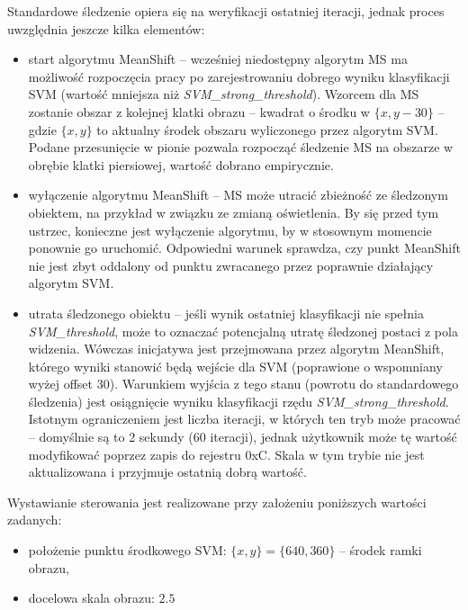 Standardowe śledzenie opiera się na weryfikacji ostatniej iteracji, jednak proces uwzględnia jeszcze kilka elementów:
\begin{itemize}
	\item start algorytmu MeanShift -- wcześniej niedostępny algorytm MS ma możliwość rozpoczęcia pracy po zarejestrowaniu dobrego wyniku klasyfikacji SVM (wartość mniejsza niż \textit{SVM\_strong\_threshold}). %
	Wzorcem dla MS zostanie obszar z kolejnej klatki obrazu -- kwadrat o środku w $\{x,y-30\}$ -- gdzie $\{x,y\}$ to aktualny środek obszaru wyliczonego przez algorytm SVM. 
	Podane przesunięcie w pionie pozwala rozpocząć śledzenie MS na obszarze w obrębie klatki piersiowej, wartość dobrano empirycznie.
	
	\item wyłączenie algorytmu MeanShift -- MS może utracić zbieżność ze śledzonym obiektem, na przykład w związku ze zmianą oświetlenia. %
	By się przed tym ustrzec, konieczne jest wyłączenie algorytmu, by w stosownym momencie ponownie go uruchomić. 
	Odpowiedni warunek sprawdza, czy punkt MeanShift nie jest zbyt oddalony od punktu zwracanego przez poprawnie działający algorytm SVM.
	
	\item utrata śledzonego obiektu -- jeśli wynik ostatniej klasyfikacji nie spełnia \textit{SVM\_threshold}, może to oznaczać potencjalną utratę śledzonej postaci z pola widzenia. 
	Wówczas inicjatywa jest przejmowana przez algorytm MeanShift, którego wyniki stanowić będą wejście dla SVM (poprawione o wspomniany wyżej offset $30$). %
	Warunkiem wyjścia z tego stanu (powrotu do standardowego śledzenia) jest osiągnięcie wyniku klasyfikacji rzędu \textit{SVM\_strong\_threshold}.
	Istotnym ograniczeniem jest liczba iteracji, w których ten tryb może pracować -- domyślnie są to 2 sekundy (60 iteracji), jednak użytkownik może tę wartość modyfikować poprzez zapis do rejestru 0xC. %
	Skala w tym trybie nie jest aktualizowana i przyjmuje ostatnią dobrą wartość. %
\end{itemize} 


Wystawianie sterowania jest realizowane przy założeniu poniższych wartości zadanych:
\begin{itemize}
	\item położenie punktu środkowego SVM: $\{x,y\}=\{640,360\}$ -- środek ramki obrazu,
	\item docelowa skala obrazu: $2.5$ %
\end{itemize}

